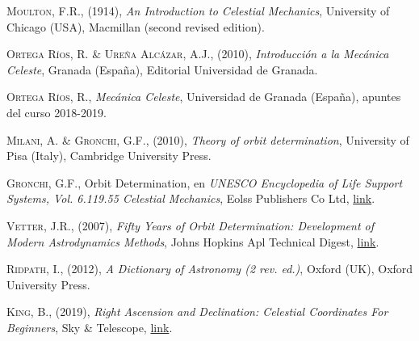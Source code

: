 \documentclass[11pt]{book}
\begin{document}


\thispagestyle{empty}

\tableofcontents  %
\thispagestyle{empty}
\listoffigures    %
\newpage
\thispagestyle{empty}








\appendix




\begin{thebibliography}{99}
 \textsc{Moulton, F.R.}, (1914), \textit{An Introduction to Celestial Mechanics}, University of Chicago (USA), Macmillan (second revised edition).

 \textsc{Ortega Ríos, R. \& Ureña Alcázar, A.J.}, (2010), \textit{Introducción a la Mecánica Celeste}, Granada (España), Editorial Universidad de Granada.

 \textsc{Ortega Ríos, R.}, \textit{Mecánica Celeste}, Universidad de Granada (España), apuntes del curso 2018-2019.

 \textsc{Milani, A. \& Gronchi, G.F.}, (2010), \textit{Theory of
orbit determination}, University of Pisa (Italy), Cambridge University Press.

 \textsc{Gronchi, G.F.}, Orbit Determination, en \textit{UNESCO Encyclopedia of Life Support Systems, Vol. 6.119.55 Celestial Mechanics}, Eolss Publishers Co Ltd, \href{http://adams.dm.unipi.it/~gronchi/PDF/gronchi_unesco.pdf}{link}.

 \textsc{Vetter, J.R.}, (2007), \textit{Fifty Years of Orbit Determination: Development of Modern Astrodynamics Methods}, Johns Hopkins Apl Technical Digest, \href{https://www.jhuapl.edu/Content/techdigest/pdf/V27-N03/27-03-Vetter.pdf}{link}.

 \textsc{Ridpath, I.}, (2012), \textit{A Dictionary of Astronomy (2 rev. ed.)}, Oxford (UK), Oxford University Press.

 \textsc{King, B.}, (2019), \textit{Right Ascension and Declination: Celestial Coordinates For Beginners}, Sky \& Telescope, \href{https://skyandtelescope.org/astronomy-resources/right-ascension-declination-celestial-coordinates/}{link}.


\end{thebibliography}
\end{document}
